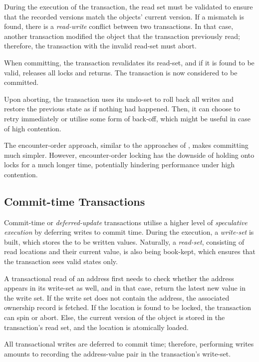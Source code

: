During the execution of the transaction, the read set must be validated to ensure that the recorded versions match the objects' current version. If a mismatch is found, there is a \textit{read-write} conflict between two transactions. In that case, another transaction modified the object that the transaction previously read; therefore, the transaction with the invalid read-set must abort.

When committing, the transaction revalidates its read-set, and if it is found to be valid, releases all locks and returns. The transaction is now considered to be committed.

Upon aborting, the transaction uses its undo-set to roll back all writes and restore the previous state as if nothing had happened. Then, it can choose to retry immediately or utilise some form of back-off, which might be useful in case of high contention.

The encounter-order approach, similar to the approaches of \cite{tl,ennals-stm}, makes committing much simpler. However, encounter-order locking has the downside of holding onto locks for a much longer time, potentially hindering performance under high contention.

\subsection{Commit-time Transactions}
\label{subsection:ctx}
Commit-time or \textit{deferred-update} transactions utilise a higher level of \textit{speculative execution} by deferring writes to commit time. During the execution, a \textit{write-set} is built, which stores the to be written values. Naturally, a \textit{read-set}, consisting of read locations and their current value, is also being book-kept, which ensures that the transaction sees valid states only.

A transactional read of an address first needs to check whether the address appears in its write-set as well, and in that case, return the latest new value in the write set. If the write set does not contain the address, the associated ownership record is fetched. If the location is found to be locked, the transaction can spin or abort. Else, the current version of the object is stored in the transaction's read set, and the location is atomically loaded.

All transactional writes are deferred to commit time; therefore, performing writes amounts to recording the address-value pair in the transaction's write-set.

